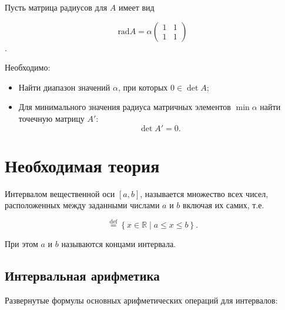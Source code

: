 \documentclass{article}
\begin{document}
  Пусть матрица радиусов для \( A \) имеет вид

  \[
    \text{rad} A = \alpha \begin{pmatrix}
      1 & 1 \\
      1 & 1
    \end{pmatrix}
  \].

  Необходимо:

  \begin{itemize}
    \item Найти диапазон значений \( \alpha \), при которых
      \( 0 \in \det A \);
    \item Для минимального значения радиуса матричных элементов
      \( \min \alpha \) найти точечную матрицу \( A' \):
      \[
        \det A' = 0.
      \]
  \end{itemize}

  \section{Необходимая теория}

  Интервалом вещественной оси \( [a, b] \), называется множество всех
  чисел, расположенных между заданными числами \( a \) и \( b \) включая
  их самих, т.е.

  \begin{equation}
    [a, b] \stackrel{\text{def}}{=}
    \left \{ x \in \mathbb{R} \mid a \leqslant x \leqslant b \right \}.
  \end{equation}

  При этом \( a \) и \( b \) называются концами интервала.

  \subsection{Интервальная арифметика}

  Развернутые формулы основных арифметических операций для интервалов:
\end{document}
